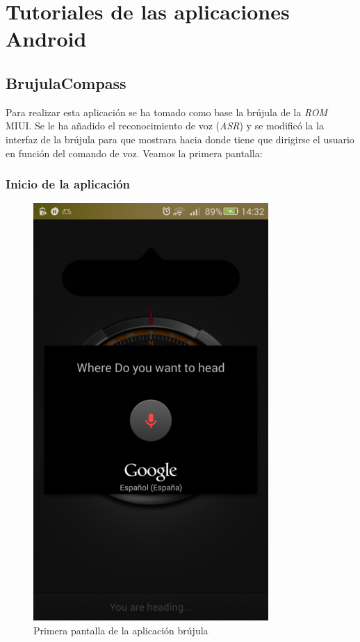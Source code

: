 \section{Tutoriales de las aplicaciones
Android}\label{tutoriales-de-las-aplicaciones-android}

\subsection{BrujulaCompass}\label{brujulacompass}

Para realizar esta aplicación se ha tomado como base la brújula de la
\emph{ROM} MIUI. Se le ha añadido el reconocimiento de voz (\emph{ASR})
y se modificó la la interfaz de la brújula para que mostrara hacia donde
tiene que dirigirse el usuario en función del comando de voz. Veamos la
primera pantalla:

\subsubsection{Inicio de la
aplicación}\label{inicio-de-la-aplicaciuxf3n}

\begin{figure}[htbp]
\centering
\includegraphics{./img/inicioBrujula.png}
\caption{Primera pantalla de la aplicación brújula}
\end{figure}

